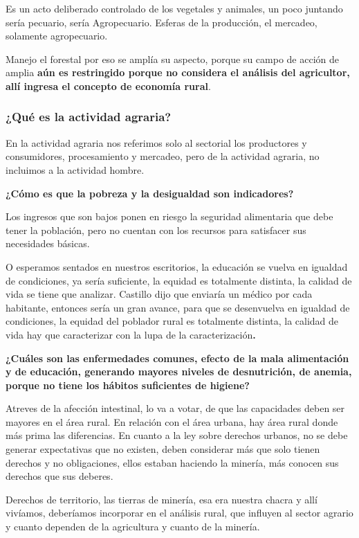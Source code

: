 \documentclass[
  letterpaper,
  DIV=11,
  numbers=noendperiod]{scrartcl}
\begin{document}
Es un acto deliberado controlado de los vegetales y animales, un poco
juntando sería pecuario, sería Agropecuario. Esferas de la producción,
el mercadeo, solamente agropecuario.

Manejo el forestal por eso se amplía su aspecto, porque su campo de
acción de amplia \textbf{aún es restringido porque no considera el
análisis del agricultor, allí ingresa el concepto de economía rural}.

\hypertarget{quuxe9-es-la-actividad-agraria}{%
\subsubsection{¿Qué es la actividad
agraria?}\label{quuxe9-es-la-actividad-agraria}}

En la actividad agraria nos referimos solo al sectorial los productores
y consumidores, procesamiento y mercadeo, pero de la actividad agraria,
no incluimos a la actividad hombre.

\textbf{¿Cómo es que la pobreza y la desigualdad son indicadores?}

Los ingresos que son bajos ponen en riesgo la seguridad alimentaria que
debe tener la población, pero no cuentan con los recursos para
satisfacer sus necesidades básicas.

O esperamos sentados en nuestros escritorios, la educación se vuelva en
igualdad de condiciones, ya sería suficiente, la equidad es totalmente
distinta, la calidad de vida se tiene que analizar. Castillo dijo que
enviaría un médico por cada habitante, entonces sería un gran avance,
para que se desenvuelva en igualdad de condiciones, la equidad del
poblador rural es totalmente distinta, la calidad de vida hay que
caracterizar con la lupa de la caracterización\textbf{.}

\textbf{¿Cuáles son las enfermedades comunes, efecto de la mala
alimentación y de educación, generando mayores niveles de desnutrición,
de anemia, porque no tiene los hábitos suficientes de higiene?}

Atreves de la afección intestinal, lo va a votar, de que las capacidades
deben ser mayores en el área rural. En relación con el área urbana, hay
área rural donde más prima las diferencias. En cuanto a la ley sobre
derechos urbanos, no se debe generar expectativas que no existen, deben
considerar más que solo tienen derechos y no obligaciones, ellos estaban
haciendo la minería, más conocen sus derechos que sus deberes.

Derechos de territorio, las tierras de minería, esa era nuestra chacra y
allí vivíamos, deberíamos incorporar en el análisis rural, que influyen
al sector agrario y cuanto dependen de la agricultura y cuanto de la
minería.
\end{document}
